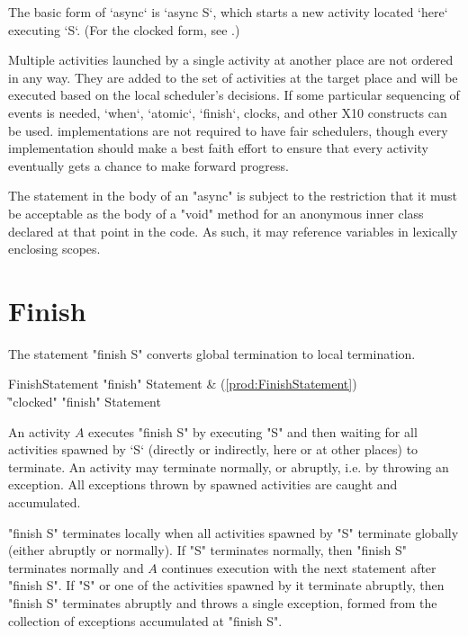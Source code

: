 The basic form of \xcd`async` is \xcd`async S`, which starts a new activity
located \xcd`here` executing \xcd`S`.   (For the clocked form, see
.)  

Multiple activities launched by a single activity at another place are not
ordered in any way. They are added to the set of activities at the target
place and will be executed based on the local scheduler's decisions.
If some particular sequencing of events is needed, \xcd`when`, \xcd`atomic`,
\xcd`finish`, clocks, and other X10 constructs can be used.
\Xten{} implementations are not required to have fair schedulers,
though every implementation should make a best faith effort to ensure
that every activity eventually gets a chance to make forward progress.

\begin{staticrule*}
The statement in the body of an \xcd"async" is subject to the
restriction that it must be acceptable as the body of a \xcd"void"
method for an anonymous inner class declared at that point in the code. As
such, it may reference variables in lexically enclosing scopes.
\end{staticrule*}

\section{Finish}\label{finish}
The statement \xcd"finish S" converts global termination to local
termination.

\begin{bbgrammar}
     FinishStatement \: \xcd"finish" Statement & (\ref{prod:FinishStatement}) \\
                    \| \xcd"clocked" \xcd"finish" Statement \\
\end{bbgrammar}

An activity $A$ executes \xcd"finish S" by executing \xcd"S" and
then waiting for all activities spawned by \xcd`S` (directly or
indirectly, here or at other places) to terminate. An activity may
terminate normally, or abruptly, i.e. by throwing an exception.
All exceptions thrown by spawned activities are caught and
accumulated. 

\xcd"finish S" terminates locally when all activities spawned by
\xcd"S" terminate globally (either abruptly or normally). If \xcd"S"
terminates normally, then \xcd"finish S" terminates normally and $A$
continues execution with the next statement after \xcd"finish S".  If
\xcd"S" or one of the activities spawned by it terminate abruptly,
then \xcd"finish S" terminates abruptly and throws a single exception,
 formed from the collection of
exceptions accumulated at \xcd"finish S".

